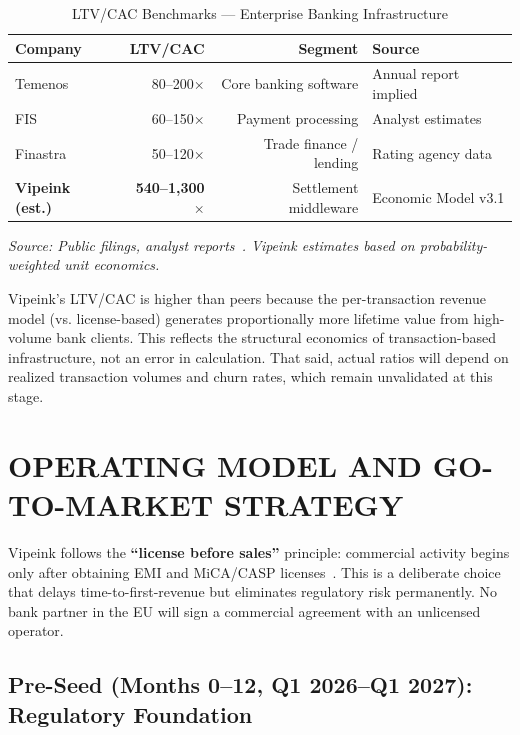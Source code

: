 \documentclass[11pt,a4paper]{article}
\newcommand{\tablesource}[1]{%
\par\vspace{3pt}%
{\footnotesize\color{gray!80}\textit{Source: #1}}%
\par\vspace{2pt}%
}
\begin{document}
\begin{table}[htbp]
\centering
\caption{LTV/CAC Benchmarks --- Enterprise Banking Infrastructure}
\begin{tabularx}{\linewidth}{@{}lrrX@{}}
\toprule
\textbf{Company} & \textbf{LTV/CAC} & \textbf{Segment} & \textbf{Source} \\
\midrule
Temenos~\cite{temenos_ar}    & 80--200$\times$   & Core banking software    & Annual report implied \\
FIS~\cite{fis_ar}            & 60--150$\times$   & Payment processing       & Analyst estimates \\
Finastra~\cite{finastra_ar}  & 50--120$\times$   & Trade finance / lending  & Rating agency data \\
\textbf{Vipeink (est.)}      & \textbf{540--1,300$\times$} & Settlement middleware & Economic Model v3.1 \\
\bottomrule
\end{tabularx}
\tablesource{Public filings, analyst reports~\cite{pitchbook}. Vipeink estimates based on probability-weighted unit economics.}
\end{table}

Vipeink's LTV/CAC is higher than peers because the per-transaction revenue model (vs. license-based) generates proportionally more lifetime value from high-volume bank clients. This reflects the structural economics of transaction-based infrastructure, not an error in calculation. That said, actual ratios will depend on realized transaction volumes and churn rates, which remain unvalidated at this stage.


\FloatBarrier
\section{OPERATING MODEL AND GO-TO-MARKET STRATEGY}

Vipeink follows the \textbf{``license before sales''} principle: commercial activity begins only after obtaining EMI and MiCA/CASP licenses~\cite{lb_emi,mica_reg}. This is a deliberate choice that delays time-to-first-revenue but eliminates regulatory risk permanently. No bank partner in the EU will sign a commercial agreement with an unlicensed operator.

\subsection*{Pre-Seed (Months 0--12, Q1 2026--Q1 2027): Regulatory Foundation}
\end{document}
